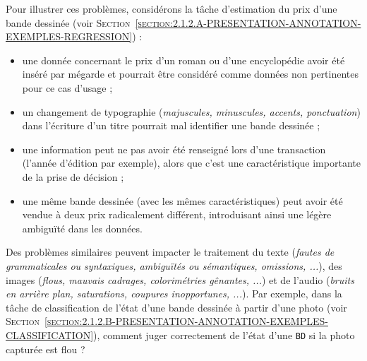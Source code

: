			\begin{leftBarExamples}
				Pour illustrer ces problèmes, considérons la tâche d'estimation du prix d'une bande dessinée (voir \textsc{Section~\ref{section:2.1.2.A-PRESENTATION-ANNOTATION-EXEMPLES-REGRESSION}}) :
				\begin{itemize}
					\item une donnée concernant le prix d'un roman ou d'une encyclopédie avoir été inséré par mégarde et pourrait être considéré comme données non pertinentes pour ce cas d'usage ;
					\item un changement de typographie (\textit{majuscules, minuscules, accents, ponctuation}) dans l'écriture d'un titre pourrait mal identifier une bande dessinée ;
					\item une information peut ne pas avoir été renseigné lors d'une transaction (l'année d'édition par exemple), alors que c'est une caractéristique importante de la prise de décision ;
					\item une même bande dessinée (avec les mêmes caractéristiques) peut avoir été vendue à deux prix radicalement différent, introduisant ainsi une légère ambiguïté dans les données.
				\end{itemize}
				
				Des problèmes similaires peuvent impacter le traitement du texte (\textit{fautes de grammaticales ou syntaxiques, ambiguïtés ou sémantiques, omissions, ...}), des images (\textit{flous, mauvais cadrages, colorimétries gênantes, ...}) et de l'audio (\textit{bruits en arrière plan, saturations, coupures inopportunes, ...}).
				Par exemple, dans la tâche de classification de l'état d'une bande dessinée à partir d'une photo (voir \textsc{Section~\ref{section:2.1.2.B-PRESENTATION-ANNOTATION-EXEMPLES-CLASSIFICATION}}), comment juger correctement de l'état d'une \texttt{BD} si la photo capturée est flou ?
			\end{leftBarExamples}
			
